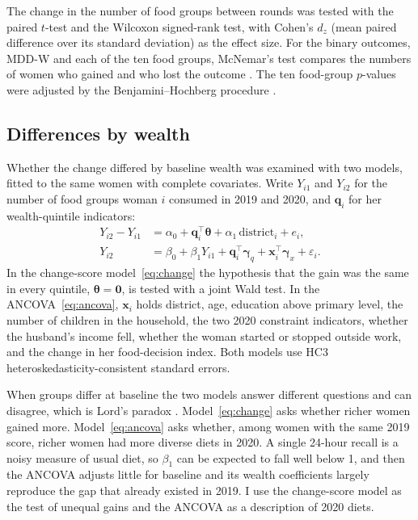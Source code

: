 The change in the number of food groups between rounds was tested with the paired $t$-test and the Wilcoxon signed-rank test, with Cohen's $d_z$ (mean paired difference over its standard deviation) as the effect size. For the binary outcomes, MDD-W and each of the ten food groups, McNemar's test compares the numbers of women who gained and who lost the outcome \parencite{mcnemar1947}. The ten food-group $p$-values were adjusted by the Benjamini--Hochberg procedure \parencite{benjamini1995}.

\subsection{Differences by wealth}\label{sec:wealth-models}
Whether the change differed by baseline wealth was examined with two models, fitted to the same \PanAncN{} women with complete covariates. Write $Y_{i1}$ and $Y_{i2}$ for the number of food groups woman $i$ consumed in 2019 and 2020, and $\mathbf{q}_i$ for her wealth-quintile indicators:
\begin{align}
Y_{i2} - Y_{i1} &= \alpha_0 + \mathbf{q}_i^\top\bm\theta + \alpha_1\,\text{district}_i + e_i, \label{eq:change}\\
Y_{i2} &= \beta_0 + \beta_1 Y_{i1} + \mathbf{q}_i^\top\bm\gamma_q + \mathbf{x}_i^\top\bm\gamma_x + \varepsilon_i. \label{eq:ancova}
\end{align}
In the change-score model~\eqref{eq:change} the hypothesis that the gain was the same in every quintile, $\bm\theta = \mathbf{0}$, is tested with a joint Wald test. In the ANCOVA~\eqref{eq:ancova}, $\mathbf{x}_i$ holds district, age, education above primary level, the number of children in the household, the two 2020 constraint indicators, whether the husband's income fell, whether the woman started or stopped outside work, and the change in her food-decision index. Both models use HC3 heteroskedasticity-consistent standard errors.

When groups differ at baseline the two models answer different questions and can disagree, which is Lord's paradox \parencite{lord1967}. Model~\eqref{eq:change} asks whether richer women gained more. Model~\eqref{eq:ancova} asks whether, among women with the same 2019 score, richer women had more diverse diets in 2020. A single 24-hour recall is a noisy measure of usual diet, so $\beta_1$ can be expected to fall well below 1, and then the ANCOVA adjusts little for baseline and its wealth coefficients largely reproduce the gap that already existed in 2019. I use the change-score model as the test of unequal gains and the ANCOVA as a description of 2020 diets.

